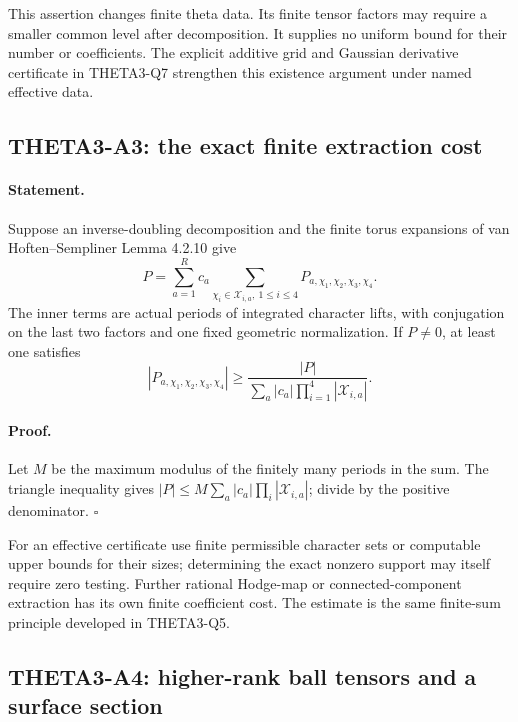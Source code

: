 \documentclass[11pt]{article}
\begin{document}
This assertion changes finite theta data. Its finite tensor factors
may require a smaller common level after decomposition. It supplies
no uniform bound for their number or coefficients. The explicit
additive grid and Gaussian derivative certificate in THETA3-Q7
strengthen this existence argument under named effective data.

\subsection{THETA3-A3: the exact finite extraction cost}\label{A3}

\paragraph{Statement.}
Suppose an inverse-doubling decomposition and the finite torus
expansions of van Hoften--Sempliner Lemma 4.2.10 give
\[
 P=\sum_{a=1}^{R}c_a
       \sum_{\chi_i\in\mathcal X_{i,a},\ 1\leq i\leq4}
                       P_{a,\chi_1,\chi_2,\chi_3,\chi_4}.
\]
The inner terms are actual periods of integrated character lifts, with
conjugation on the last two factors and one fixed geometric
normalization. If $P\ne0$, at least one satisfies
\[
 |P_{a,\chi_1,\chi_2,\chi_3,\chi_4}|
 \geq \frac{|P|}{\sum_a|c_a|\prod_{i=1}^4|\mathcal X_{i,a}|}.
\]

\paragraph{Proof.}
Let $M$ be the maximum modulus of the finitely many periods in the
sum. The triangle inequality gives
$|P|\leq M\sum_a|c_a|\prod_i|\mathcal X_{i,a}|$; divide by the
positive denominator. $\square$

For an effective certificate use finite permissible character sets or
computable upper bounds for their sizes; determining the exact nonzero
support may itself require zero testing. Further rational Hodge-map or
connected-component extraction has its own finite coefficient cost.
The estimate is the same finite-sum principle developed in THETA3-Q5.

\subsection{THETA3-A4: higher-rank ball tensors and a surface section}\label{A4}
\end{document}
